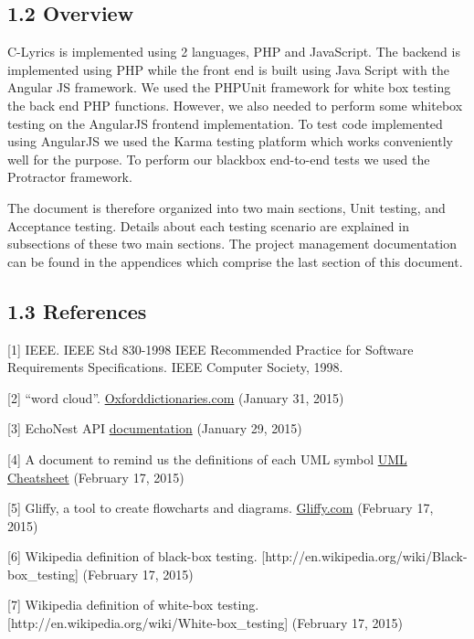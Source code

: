 \documentclass[]{article}
\begin{document}
\subsection{\textbf{1.2 Overview }}\label{overview}

C-Lyrics is implemented using 2 languages, PHP and JavaScript. The
backend is implemented using PHP while the front end is built using Java
Script with the Angular JS framework. We used the PHPUnit framework for
white box testing the back end PHP functions. However, we also needed to
perform some whitebox testing on the AngularJS frontend implementation.
To test code implemented using AngularJS we used the Karma testing
platform which works conveniently well for the purpose. To perform our
blackbox end-to-end tests we used the Protractor framework.

The document is therefore organized into two main sections, Unit
testing, and Acceptance testing. Details about each testing scenario are
explained in subsections of these two main sections. The project
management documentation can be found in the appendices which comprise
the last section of this document.


\subsection{\textbf{1.3 References}}\label{references}
{[}1{]}
IEEE. IEEE Std 830-1998 IEEE Recommended Practice for Software
Requirements Specifications. IEEE Computer Society, 1998.

{[}2{]} ``word cloud''.
\href{http://www.oxforddictionaries.com/us/definition/american_english/word-cloud}{Oxforddictionaries.com}
(January 31, 2015)

{[}3{]} EchoNest API
\href{http://developer.echonest.com/docs/v4/index.html\#overview}{documentation}
(January 29, 2015)

{[}4{]} A document to remind us the definitions of each UML symbol
\href{http://loufranco.com/wp-content/uploads/2012/11/cheatsheet.pdf}{UML
Cheatsheet} (February 17, 2015)

{[}5{]} Gliffy, a tool to create flowcharts and diagrams.
\href{https://www.gliffy.com}{Gliffy.com} (February 17, 2015)

{[}6{]} Wikipedia definition of black-box testing.
{[}http://en.wikipedia.org/wiki/Black-box\_testing{]} (February 17,
2015)

{[}7{]} Wikipedia definition of white-box testing.
{[}http://en.wikipedia.org/wiki/White-box\_testing{]} (February 17,
2015)
\end{document}
